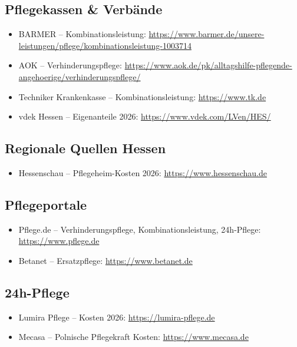 \documentclass[11pt,a4paper]{article}
\begin{document}
\subsection{Pflegekassen \& Verbände}
\begin{itemize}[noitemsep]
    \item BARMER -- Kombinationsleistung: \url{https://www.barmer.de/unsere-leistungen/pflege/kombinationsleistung-1003714}
    \item AOK -- Verhinderungspflege: \url{https://www.aok.de/pk/alltagshilfe-pflegende-angehoerige/verhinderungspflege/}
    \item Techniker Krankenkasse -- Kombinationsleistung: \url{https://www.tk.de}
    \item vdek Hessen -- Eigenanteile 2026: \url{https://www.vdek.com/LVen/HES/}
\end{itemize}

\subsection{Regionale Quellen Hessen}
\begin{itemize}[noitemsep]
    \item Hessenschau -- Pflegeheim-Kosten 2026: \url{https://www.hessenschau.de}
\end{itemize}

\subsection{Pflegeportale}
\begin{itemize}[noitemsep]
    \item Pflege.de -- Verhinderungspflege, Kombinationsleistung, 24h-Pflege: \url{https://www.pflege.de}
    \item Betanet -- Ersatzpflege: \url{https://www.betanet.de}
\end{itemize}

\subsection{24h-Pflege}
\begin{itemize}[noitemsep]
    \item Lumira Pflege -- Kosten 2026: \url{https://lumira-pflege.de}
    \item Mecasa -- Polnische Pflegekraft Kosten: \url{https://www.mecasa.de}
\end{itemize}
\end{document}
